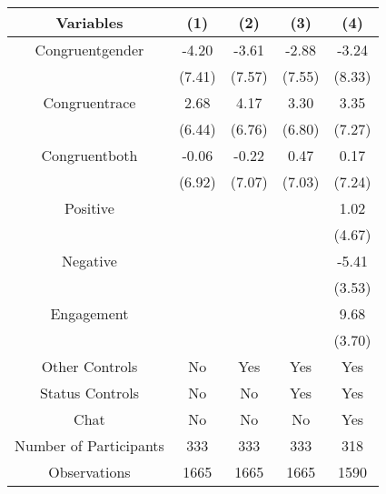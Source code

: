 \begin{table}[htbp]
    \begin{tabular}{c c c c c}
    \toprule
    \textbf{Variables} & \textbf{(1)} & \textbf{(2)} & \textbf{(3)}      & \textbf{(4)}     \\ 
\midrule
Congruentgender           &     -4.20              &     -3.61          &  -2.88            &  -3.24 \\
                                            &     (7.41)             &     (7.57)         &  (7.55)           &  (8.33) \\
\addlinespace
Congruentrace           &      2.68              &     4.17           &   3.30            &  3.35   \\
                                            &      (6.44)            &     (6.76)         &   (6.80)          &  (7.27) \\
\addlinespace
Congruentboth                 &      -0.06              &   -0.22           &  0.47             &  0.17  \\
                                            &      (6.92)            &    (7.07)          &  (7.03)           &  (7.24) \\
\addlinespace
Positive                         &                     &                     &                    &  1.02  \\
                                 &                     &                     &                    &  (4.67)  \\
\addlinespace
Negative                         &                     &                     &                    &  -5.41  \\
                                 &                     &                     &                    &  (3.53)  \\
\addlinespace
Engagement                       &                     &                     &                    &  9.68\sym{**}  \\
                                 &                     &                     &                    &  (3.70)  \\

\midrule
Other Controls                   &    No                &    Yes              &    Yes          &    Yes        \\
Status Controls                    &    No                &    No               &    Yes          &    Yes        \\
Chat                             &    No                &    No               &    No           &    Yes        \\
\midrule
Number of Participants           &    333               &    333              &    333          &    318       \\
\midrule
Observations                     &       1665           &       1665          &  1665           &  1590    \\
\bottomrule



\end{tabular}
\end{table}
